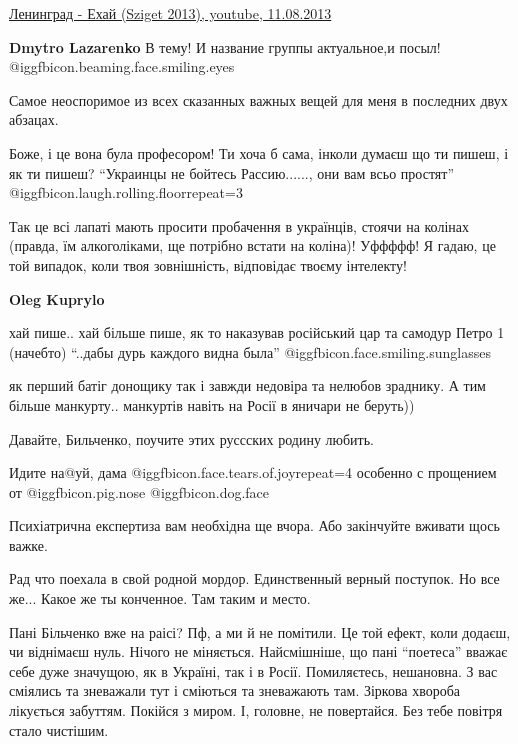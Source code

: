 \begin{itemize}

\href{https://youtu.be/AQqiUusn04k}{%
Ленинград - Ехай (Sziget 2013), youtube, 11.08.2013%
}

\textbf{Dmytro Lazarenko} В тему! И название группы актуальное,и посыл!  @igg{fbicon.beaming.face.smiling.eyes} 

Самое неоспоримое из всех сказанных важных вещей для меня в последних двух абзацах.


Боже, і це вона була професором! Ти хоча б сама, інколи думаєш що ти пишеш, і як ти пишеш?
\enquote{Украинцы не бойтесь Рассию......, они вам всьо простят} @igg{fbicon.laugh.rolling.floor}{repeat=3} 

Так це всі лапаті мають просити пробачення в українців, стоячи на колінах
(правда, їм алкоголіками, ще потрібно встати на коліна)!  Уффффф! Я гадаю, це той
випадок, коли твоя зовнішність, відповідає твоєму інтелекту!

\begin{itemize} %
\textbf{Oleg Kuprylo} 

хай пише.. хай більше пише, як то наказував російський цар та самодур Петро 1
(начебто) \enquote{..дабы дурь каждого видна была} @igg{fbicon.face.smiling.sunglasses} 



як перший батіг донощику так і завжди недовіра та нелюбов зраднику. А тим
більше манкурту.. манкуртів навіть на Росії в яничари не беруть))

\end{itemize} %

Давайте, Бильченко, поучите этих руссских родину любить.

Идите на@уй, дама @igg{fbicon.face.tears.of.joy}{repeat=4}  особенно с
прощением от  @igg{fbicon.pig.nose}  @igg{fbicon.dog.face} 

Психіатрична експертиза вам необхідна ще вчора. Або закінчуйте вживати щось важке.

Рад что поехала в свой родной мордор. Единственный верный поступок. Но все
же... Какое же ты конченное. Там таким и место.


Пані Більченко вже на раісі? Пф, а ми й не помітили. Це той ефект, коли додаєш,
чи віднімаєш нуль. Нічого не міняється. Найсмішніше, що пані \enquote{поетеса} вважає
себе дуже значущою, як в Україні, так і в Росії. Помиляєтесь, нешановна. З вас
сміялись та зневажали тут і сміються та зневажають там. Зіркова хвороба
лікується забуттям. Покійся з миром. І, головне, не повертайся. Без тебе
повітря стало чистішим.


\end{itemize}
